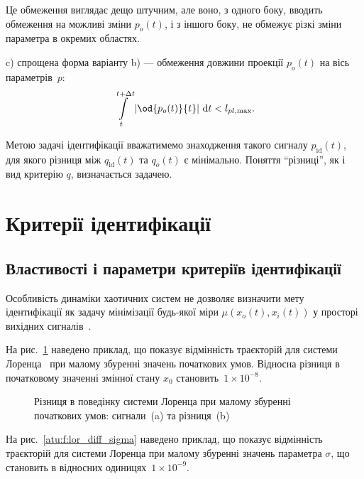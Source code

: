 Це обмеження виглядає дещо штучним, але воно, з одного боку,
вводить обмеження на можливі зміни
$p_o(t)$, і з іншого боку, не обмежує різкі зміни параметра в
окремих областях.

c) спрощена форма варіанту b) --- обмеження довжини проекції
$p_o(t)$ на вісь параметрів~$p$:
%
\begin{equation}
  \int\limits_{t}^{t+\Delta t} \left| \od{p_o(t)}{t} \right | \, \mathrm{d}t < l_{pl,\max}.
  \label{atu:eq:p_lim_pl}
\end{equation}

Метою задачі ідентифікації вважатимемо знаходження такого
сигналу
$p_\mathrm{id}(t)$, для якого різниця
між
$q_\mathrm{id}(t)$ та
$q_o(t)$ \label{atu:d:q_o} є мінімально. Поняття ``різниці'', як і вид критерію
$q$, визначається задачею.


\section{Критерії ідентифікації} %

\subsection{Властивості і параметри критеріїв ідентифікації} %

Особливість динаміки хаотичних систем не дозволяє визначити мету ідентифікації
як задачу мінімізації будь-якої міри
$\mu(x_o(t), x_i(t))$ у просторі вихідних
сигналів~\cite{atu_asau11,atu_asau12,atu_asau14,atu_electronika2013}.


На рис.~\ref{atu:f:lor_diff_x0} наведено приклад, що показує відмінність
траєкторій для системи Лоренца~\cite{moon_chaotic_vibr} при малому збуренні
значень початкових умов. Відносна різниця в початковому
значенні змінної стану
$x_0$ становить~$1 \times 10^{-8}$.

\begin{figure}[htb!]
  \caption{Різниця в поведінку системи Лоренца при малому збуренні початкових умов: сигнали~(a) та різниця~(b)}
\label{atu:f:lor_diff_x0}
\end{figure}


На рис.~\ref{atu:f:lor_diff_sigma} наведено приклад, що показує відмінність
траєкторій для системи Лоренца при малому збуренні значень
параметра
$\sigma$, що становить в відносних одиницях~$ 1 \times 10^{-9}$.

